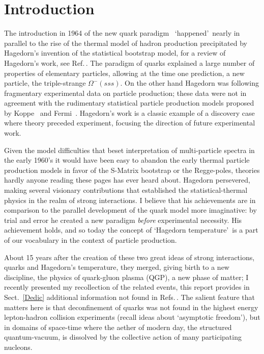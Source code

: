 \documentclass{appolb}
\begin{document}
\section{Introduction}

The introduction in 1964 of the new quark paradigm~\cite{Karl:2010zz} \lq happened\rq\ nearly in parallel to the rise of the thermal model of hadron production precipitated by Hagedorn\rq s invention of the statistical bootstrap model, for a review of Hagedorn\rq s work, see Ref.\,\cite{Rafelski:2016hnq}. The paradigm of quarks explained a large number of properties of elementary particles, allowing at the time one prediction, a new particle, the triple-strange $\Omega^{-}\!(sss)$. On the other hand Hagedorn was following fragmentary experimental data on particle production; these data were not in agreement with the rudimentary statistical particle production models proposed by Koppe~\cite{Koppe:1949zz} and Fermi~\cite{Fermi:1950jd}. Hagedorn\rq s work is a classic example of a discovery case where theory preceded experiment, focusing the direction of future experimental work.

Given the model difficulties that beset interpretation of multi-particle spectra in the early 1960\rq s it would have been easy to abandon the early thermal particle production models in favor of the S-Matrix bootstrap or the Regge-poles, theories hardly anyone reading these pages has ever heard about. Hagedorn persevered, making several visionary contributions that established the statistical-thermal physics in the realm of strong interactions. I believe that his achievements are in comparison to the parallel development of the quark model more imaginative: by trial and error he created a new paradigm {\em before} experimental necessity. His achievement holds, and so today the concept of \lq Hagedorn temperature\rq\ is a part of our vocabulary in the context of particle production. 

About 15 years after the creation of these two great ideas of strong interactions, quarks and Hagedorn\rq s temperature, they merged, giving birth to a new discipline, the physics of quark-gluon plasma (QGP), a new phase of matter; I recently presented my recollection of the related events, this report provides in Sect.~\ref{Dedic} additional information not found in Refs.\,\cite{Rafelski:2016hnq,Rafelski:2015cxa}. The salient feature that matters here is that deconfinement of quarks was not found in the highest energy lepton-hadron collision experiments (recall ideas about \lq asymptotic freedom\rq), but in domains of space-time where the aether of modern day, the structured quantum-vacuum, is dissolved by the collective action of many participating nucleons. 
\end{document}
